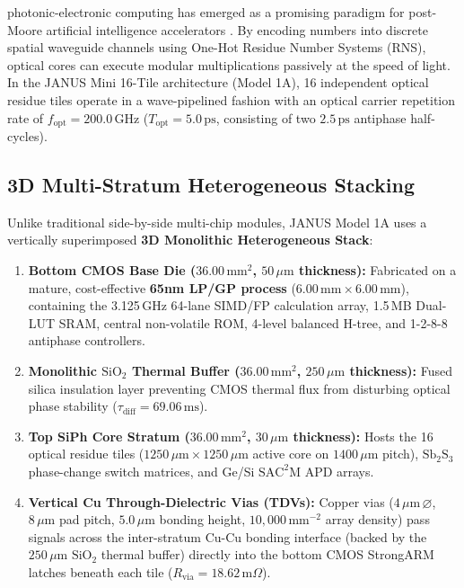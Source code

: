 \documentclass[10pt,journal,compsoc]{IEEEtran}
\begin{document}
 photonic-electronic computing has emerged as a promising paradigm for post-Moore artificial intelligence accelerators \cite{dong2022sb2s3}. By encoding numbers into discrete spatial waveguide channels using One-Hot Residue Number Systems (RNS), optical cores can execute modular multiplications passively at the speed of light. In the JANUS Mini 16-Tile architecture (Model 1A), 16 independent optical residue tiles operate in a wave-pipelined fashion with an optical carrier repetition rate of $f_{\text{opt}} = 200.0\,\text{GHz}$ ($T_{\text{opt}} = 5.0\,\text{ps}$, consisting of two $2.5\,\text{ps}$ antiphase half-cycles).

\subsection{3D Multi-Stratum Heterogeneous Stacking}
Unlike traditional side-by-side multi-chip modules, JANUS Model 1A uses a vertically superimposed \textbf{3D Monolithic Heterogeneous Stack}:
\begin{enumerate}
    \item \textbf{Bottom CMOS Base Die ($36.00\,\text{mm}^2$, $50\,\mu\text{m}$ thickness):} Fabricated on a mature, cost-effective \textbf{65nm LP/GP process} ($6.00\,\text{mm} \times 6.00\,\text{mm}$), containing the 3.125\,GHz 64-lane SIMD/FP calculation array, 1.5\,MB Dual-LUT SRAM, central non-volatile ROM, 4-level balanced H-tree, and 1-2-8-8 antiphase controllers.
    \item \textbf{Monolithic $\text{SiO}_2$ Thermal Buffer ($36.00\,\text{mm}^2$, $250\,\mu\text{m}$ thickness):} Fused silica insulation layer preventing CMOS thermal flux from disturbing optical phase stability ($\tau_{\text{diff}} = 69.06\,\text{ms}$).
    \item \textbf{Top SiPh Core Stratum ($36.00\,\text{mm}^2$, $30\,\mu\text{m}$ thickness):} Hosts the 16 optical residue tiles ($1250\,\mu\text{m} \times 1250\,\mu\text{m}$ active core on $1400\,\mu\text{m}$ pitch), $\text{Sb}_2\text{S}_3$ phase-change switch matrices, and Ge/Si $\mathrm{SAC^2M}$ APD arrays.
    \item \textbf{Vertical Cu Through-Dielectric Vias (TDVs):} Copper vias ($4\,\mu\mathrm{m}\,\varnothing$, $8\,\mu\mathrm{m}$ pad pitch, $5.0\,\mu\mathrm{m}$ bonding height, $10,000\,\text{mm}^{-2}$ array density) pass signals across the inter-stratum Cu-Cu bonding interface (backed by the $250\,\mu\mathrm{m}$ $\text{SiO}_2$ thermal buffer) directly into the bottom CMOS StrongARM latches beneath each tile ($R_{\mathrm{via}} = 18.62\,\mathrm{m}\Omega$).
\end{enumerate}
\end{document}
